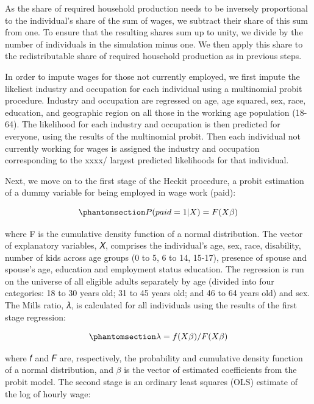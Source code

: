 \documentclass[
  11pt,
]{article}
\begin{document}
As the share of required household production needs to be inversely
proportional to the individual's share of the sum of wages, we subtract
their share of this sum from one. To ensure that the resulting shares
sum up to unity, we divide by the number of individuals in the
simulation minus one. We then apply this share to the redistributable
share of required household production as in previous steps.

In order to impute wages for those not currently employed, we first
impute the likeliest industry and occupation for each individual using a
multinomial probit procedure. Industry and occupation are regressed on
age, age squared, sex, race, education, and geographic region on all
those in the working age population (18-64). The likelihood for each
industry and occupation is then predicted for everyone, using the
results of the multinomial probit. Then each individual not currently
working for wages is assigned the industry and occupation corresponding
to the xxxx/ largest predicted likelihoods for that individual.

Next, we move on to the first stage of the Heckit procedure, a probit
estimation of a dummy variable for being employed in wage work (paid):

\begin{equation}\phantomsection\label{eq-probit}{P(paid=1|X)=F(X \beta)
}\end{equation}

where F is the cumulative density function of a normal distribution. The
vector of explanatory variables, 𝑋, comprises the individual's age, sex,
race, disability, number of kids across age groups (0 to 5, 6 to 14,
15-17), presence of spouse and spouse's age, education and employment
status education. The regression is run on the universe of all eligible
adults separately by age (divided into four categories: 18 to 30 years
old; 31 to 45 years old; and 46 to 64 years old) and sex. The Mills
ratio, 𝜆, is calculated for all individuals using the results of the
first stage regression:

\begin{equation}\phantomsection\label{eq-mills}{\lambda = f(X\beta)/ F(X\beta)
}\end{equation}

where 𝑓 and 𝐹 are, respectively, the probability and cumulative density
function of a normal distribution, and \(\beta\) is the vector of
estimated coefficients from the probit model. The second stage is an
ordinary least squares (OLS) estimate of the log of hourly wage:
\end{document}
